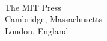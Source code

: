 \makeatletter
\begin{titlepage}
{\Huge
\noindent
\@title}
\end{titlepage}

\cleardoublepage

\thispagestyle{empty}
\vfill
{\Huge
\noindent
\@title
}\\[0.5in]
{\Large
\noindent
\@author
}
\vfill
{\large
\noindent
The MIT Press\\
Cambridge, Massachusetts\\
London, England
}\\[1in]
\makeatother

